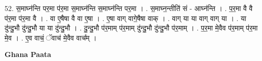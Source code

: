\documentclass[17pt]{extarticle}
\begin{document}
52. स॒माघ्न॑न्ति पर॒मा प॑र॒मा स॒माघ्न॑न्ति स॒माघ्न॑न्ति पर॒मा । . स॒माघ्न॒न्तीति॑ सं - आघ्न॑न्ति । . प॒र॒मा वै वै प॑र॒मा प॑र॒मा वै । . वा ए॒षैषा वै वा ए॒षा । . ए॒षा वाग् वागे॒षैषा वाक् । . वाग् या या वाग् वाग् या । . या दु॑न्दु॒भौ दु॑न्दु॒भौ या या दु॑न्दु॒भौ । . दु॒न्दु॒भौ प॑र॒माम् प॑र॒माम् दु॑न्दु॒भौ दु॑न्दु॒भौ प॑र॒माम् । . प॒र॒मा मे॒वैव प॑र॒माम् प॑र॒मा मे॒व । . ए॒व वाचं॒ ॅवाच॑ मे॒वैव वाच᳚म् । \newline

\textbf{Ghana Paata } \newline
\end{document}
